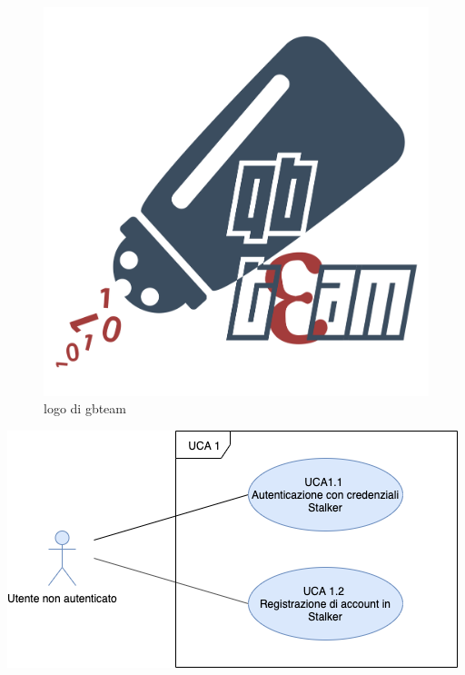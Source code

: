 \documentclass[a4paper, oneside, dvipsnames, table]{article} %
\begin{document}

\begin{figure}[h]
\centering\includegraphics[scale=0.1]{qbteam.png}%
\caption{logo di gbteam}
\label{logo}
\end{figure}


\centering\includegraphics[scale=0.8]{Panoramica.png}
\end{document}
